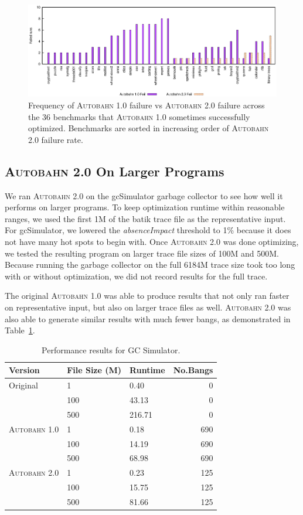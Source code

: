 \documentclass[format=sigplan, review=true]{acmart}
\newcommand{\tblref}[1]{Table~\ref{#1}}
\newcommand{\hotspots}[0]{hot spots}
\newcommand{\Ao}[0]{\textsc{Autobahn 1.0}}
\newcommand{\At}[0]{\textsc{Autobahn 2.0}}
\newcommand{\absim}[0]{\textit{absenceImpact}}
\begin{document}
\begin{figure}
\includegraphics[width=\textwidth]{pap-fail}
\caption{Frequency of \Ao{} failure vs \At{} failure across the 36
benchmarks that \Ao{} sometimes successfully optimized. Benchmarks are sorted in
increasing order of \At{} failure rate. } 
\label{fig:2-failures}
\end{figure}

\subsection{\At{} On Larger Programs}

We ran \At{} on the gcSimulator garbage collector to see how well it performs on larger programs. To keep optimization runtime within reasonable ranges, we used the first 1M of the batik trace file as the representative input. For gcSimulator, we lowered the \absim{} threshold to 1\% because it does not have many \hotspots{} to begin with. Once \At{} was done optimizing, we tested the resulting program on larger trace file sizes of 100M and 500M. Because running the garbage collector on the full 6184M trace size took too long with or without optimization, we did not record results for the full trace. 

The original \Ao{} was able to produce results that not only ran faster on representative input, but also on larger trace files as well. \At{} was also able to generate similar results with much fewer bangs, as demonstrated in \tblref{tab:gc}.

\begin{table}
\begin{tabular}{lllr}
\hline
Version   & File Size (M) & Runtime & No.Bangs \\
\hline
Original      & 1   &   0.40	 & 0   \\
          & 100        & 43.13      & 0 \\
       & 500     &  216.71 & 0 \\
\Ao{}       & 1     & 0.18    &  690\\
          & 100        & 14.19 &  690\\
                 & 500        & 68.98	& 690\\
\At{}      & 1   &  0.23 & 125    \\
          & 100        & 15.75 & 125      \\
       & 500    & 81.66 & 125    \\

\hline
\end{tabular}
\caption{Performance results for GC Simulator.}
\label{tab:gc}
\end{table}
\end{document}
